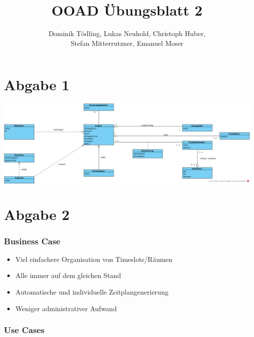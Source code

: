 \documentclass[a4paper,12pt]{article}
\title{OOAD Übungsblatt 2}
\author{Dominik Tödling, Lukas Neuhold, Christoph Huber,\\ Stefan Mitterrutzner, Emanuel Moser}
\begin{document}
\maketitle
\part*{Abgabe 1}
\begin{center}
	\includegraphics[scale=.57,angle=90]{Abgabe1.png}
\end{center}
\part*{Abgabe 2}
\section*{Business Case}
\begin{itemize}
	\item Viel einfachere Organisation von Timeslots/Räumen
	\item Alle immer auf dem gleichen Stand
	\item Automatische und individuelle Zeitplangenerierung
	\item Weniger administrativer Aufwand
\end{itemize}
\section*{Use Cases}
\end{document}
